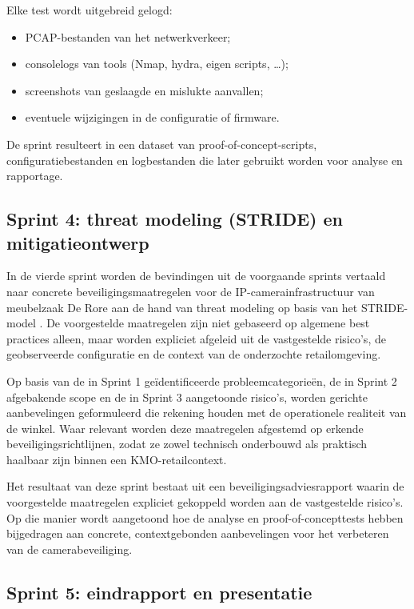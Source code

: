 Elke test wordt uitgebreid gelogd:
\begin{itemize}
    \item PCAP-bestanden van het netwerkverkeer;
    \item consolelogs van tools (Nmap, hydra, eigen scripts, \dots);
    \item screenshots van geslaagde en mislukte aanvallen;
    \item eventuele wijzigingen in de configuratie of firmware.
\end{itemize}

De sprint resulteert in een dataset van proof-of-concept-scripts, configuratiebestanden en logbestanden die later gebruikt worden voor analyse en rapportage.

\subsection*{Sprint 4: threat modeling (STRIDE) en mitigatieontwerp}
In de vierde sprint worden de bevindingen uit de voorgaande sprints vertaald naar concrete beveiligingsmaatregelen voor de IP-camerainfrastructuur van meubelzaak De Rore aan de hand van threat modeling op basis van het STRIDE-model \parencite{MicrosoftSTRIDE}. De voorgestelde maatregelen zijn niet gebaseerd op algemene best practices alleen, maar worden expliciet afgeleid uit de vastgestelde risico’s, de geobserveerde configuratie en de context van de onderzochte retailomgeving.

Op basis van de in Sprint 1 geïdentificeerde probleemcategorieën, de in Sprint 2 afgebakende scope en de in Sprint 3 aangetoonde risico’s, worden gerichte aanbevelingen geformuleerd die rekening houden met de operationele realiteit van de winkel. Waar relevant worden deze maatregelen afgestemd op erkende beveiligingsrichtlijnen, zodat ze zowel technisch onderbouwd als praktisch haalbaar zijn binnen een KMO-retailcontext.

Het resultaat van deze sprint bestaat uit een beveiligingsadviesrapport waarin de voorgestelde maatregelen expliciet gekoppeld worden aan de vastgestelde risico’s. Op die manier wordt aangetoond hoe de analyse en proof-of-concepttests hebben bijgedragen aan concrete, contextgebonden aanbevelingen voor het verbeteren van de camerabeveiliging.

\subsection*{Sprint 5: eindrapport en presentatie}

